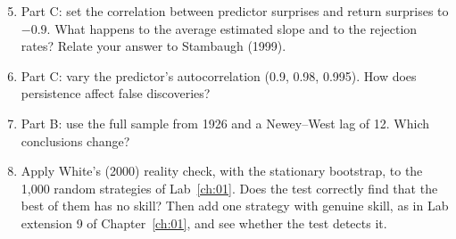 \begin{enumerate}
  \setcounter{enumi}{4}
  \item Part C: set the correlation between predictor surprises and return surprises to $-0.9$. What happens to the average estimated slope and to the rejection rates? Relate your answer to Stambaugh (1999).
  \item Part C: vary the predictor's autocorrelation (0.9, 0.98, 0.995). How does persistence affect false discoveries?
  \item Part B: use the full sample from 1926 and a Newey--West lag of 12. Which conclusions change?
  \item Apply White's (2000) reality check, with the stationary bootstrap, to the 1,000 random strategies of Lab~\ref{ch:01}. Does the test correctly find that the best of them has no skill? Then add one strategy with genuine skill, as in Lab extension 9 of Chapter~\ref{ch:01}, and see whether the test detects it.
\end{enumerate}
